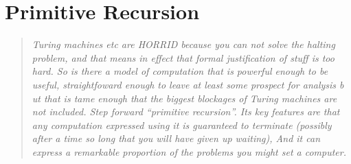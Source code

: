 \section{Primitive Recursion}
\begin{quotation}\textit{
Turing machines etc are HORRID because you can not solve the
halting problem, and that means in effect that formal justification
of stuff is too hard.
So is there a model of computation that is powerful enough to be
useful, straightfoward enough to leave at least some prospect for
analysis b ut that is tame enough that the biggest blockages of
Turing machines are not included.
Step forward ``primitive recursion''. Its key features are
that any computation expressed using it is guaranteed to terminate
(possibly after a time so long that you will have given up waiting),
And it can express a remarkable proportion of the problems you might
set a computer.
}\end{quotation}

